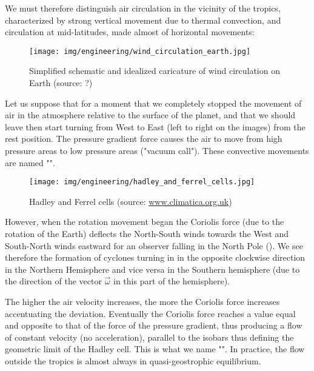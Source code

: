	We must therefore distinguish air circulation in the vicinity of the tropics, characterized by strong vertical movement due to thermal convection, and circulation at mid-latitudes, made almost of horizontal movements:
	\begin{figure}[H]
		\begin{center}
			\texttt{[image: img/engineering/wind\_circulation\_earth.jpg]}
		\end{center}	
		\caption[Simplified schematic and idealized caricature of wind circulation on Earth]{Simplified schematic and idealized caricature of wind circulation on Earth (source: ?)}
	\end{figure}
	Let us suppose that for a moment that we completely stopped the movement of air in the atmosphere relative to the surface of the planet, and that we should leave then start turning from West to East (left to right on the images) from the rest position. The pressure gradient force causes the air to move from high pressure areas to low pressure areas ("vacuum call"). These convective movements are named "".
	\begin{figure}[H]
		\begin{center}
			\texttt{[image: img/engineering/hadley\_and\_ferrel\_cells.jpg]}
		\end{center}	
		\caption[Hadley and Ferrel cells]{Hadley and Ferrel cells (source: \url{www.climatica.org.uk})}
	\end{figure}
	However, when the rotation movement began the Coriolis force (due to the rotation of the Earth) deflects the North-South winds towards the West and South-North winds eastward for an observer falling in the North Pole (). We see therefore the formation of cyclones turning in in the opposite clockwise direction  in the Northern Hemisphere and vice versa in the Southern hemisphere (due to the direction of the vector $\vec{\omega}$ in this part of the hemisphere).
	
	The higher the air velocity increases, the more the Coriolis force increases accentuating the deviation. Eventually the Coriolis force reaches a value equal and opposite to that of the force of the pressure gradient, thus producing a flow of constant velocity (no acceleration), parallel to the isobars thus defining the geometric limit of the Hadley cell. This is what we name "". In practice, the flow outside the tropics is almost always in quasi-geostrophic equilibrium.

